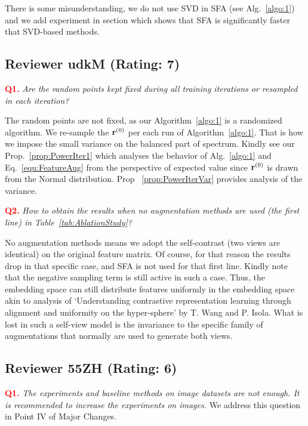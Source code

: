 There is some misunderstanding, we do not use SVD in SFA (see Alg.~\ref{algo:1}) and we add experiment in  section which shows that SFA is significantly faster that SVD-based methods.

\vspace{0.4cm}
\subsection{Reviewer udkM (Rating: 7)}
\vspace{0.1cm} \noindent\textcolor{red}{\bf Q1. } {\em Are the random points kept fixed during all training iterations or resampled in each iteration? }

\noindent The random points are not fixed, as our Algorithm~\ref{algo:1} is a randomized algorithm. We re-sample the ${\bf r}^{(0)}$ per each run of Algorithm~\ref{algo:1}. That is how we impose the small variance on the balanced part of spectrum. Kindly see our Prop.~\ref{prop:PowerIter1} which analyses the behavior of Alg.~\ref{algo:1} and Eq.~\eqref{equ:FeatureAug} from the perspective of expected value since ${\bf r}^{(0)}$ is drawn from the Normal distribution. Prop ~\ref{prop:PowerIterVar} provides analysis of the variance. 

\vspace{0.1cm} \noindent\textcolor{red}{\bf Q2.} {\em How to obtain the results when no augmentation methods are used (the first line) in Table~\ref{tab:AblationStudy}?}

\noindent No augmentation methods means we adopt the self-contrast (two views are identical) on the original feature matrix. Of course, for that reason the results drop in that specific case, and SFA is not used for that first line. Kindly note that the negative sampling term is still active in such a case. Thus, the embedding space can still distribute features uniformly in the embedding space akin to analysis of `Understanding contrastive representation learning through alignment and uniformity on the hyper-sphere' by T. Wang and P. Isola. What is lost in such a self-view model is the invariance to the specific family of augmentations that normally are used to generate both views.

\vspace{0.4cm}
\subsection{Reviewer 55ZH (Rating: 6)}
\vspace{0.1cm} \noindent\textcolor{red}{\bf Q1.} {\em The experiments and baseline methods on image datasets are not enough. It is recommended to increase the experiments on images.}  
We address this question in {\color{blue}Point IV} of {\color{blue}Major Changes}. 

